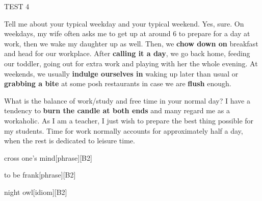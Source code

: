 \begin{glossarymc}[Cambridge 3]
\begin{test}{TEST 4}
\begin{qa}{Tell me about your typical weekday and your typical weekend.}
Yes, sure. On weekdays, my wife often asks me to get up at around 6 to prepare for a day at work, then we wake my daughter up as well. Then, we \textbf{chow down on} breakfast and head for our workplace. After \textbf{calling it a day}, we go back home, feeding our toddler, going out for extra work and playing with her the whole evening. At weekends, we usually \textbf{indulge ourselves in} waking up later than usual or \textbf{grabbing a bite} at some posh restaurants in case we are \textbf{flush} enough.
\end{qa}

\begin{qa}{What is the balance of work/study and free time in your normal day?}
I have a tendency to \textbf{burn the candle at both ends} and many regard me as a workaholic. As I am a teacher, I just wish to prepare the best thing possible for my students. Time for work normally accounts for approximately half a day, when the rest is dedicated to leisure time.
\end{qa}


\begin{VocabExplain}[Part 1]
    \begin{ExplainCard}{cross one’s mind}[phrase][B2]
\end{ExplainCard}

\begin{ExplainCard}{to be frank}[phrase][B2]
\end{ExplainCard}

\begin{ExplainCard}{night owl}[idiom][B2]
\end{ExplainCard}


\end{VocabExplain}
\end{test}
\end{glossarymc}
